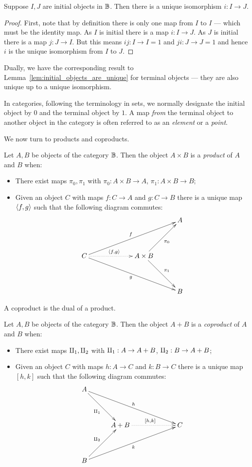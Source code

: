 \begin{lemma}\label{lem:initial_objects_are_unique}
  Suppose $I,J$ are initial objects in $\mathbb{B}$. Then there is a unique isomorphism $i:I \to J$.
\end{lemma}
\begin{proof}
  First, note that by definition there is only one map from $I$ to $I$ --- which must be the
  identity map. As $I$ is initial there is a map $i: I \to J$. As $J$ is initial there is a map
  $j:J \to I$. But this means $i j : I \to I = 1$ and $j i : J \to J = 1$ and hence $i$ is the
  unique isomorphism from $I$ to $J$.
\end{proof}

Dually, we have the corresponding result to Lemma~\ref{lem:initial_objects_are_unique} for terminal
objects --- they are also unique up to a unique isomorphism.

In categories, following the terminology in sets, we normally designate the initial object by $0$
and the terminal object by $1$.
A map \emph{from} the terminal object to another object in the category is often referred to as an
\emph{element} or a \emph{point}.

We now turn to products and coproducts.

\begin{definition}\label{def:categorical_product}
  Let $A,B$ be objects of the category $\mathbb{B}$. Then the object $A \times B$ is a \emph{product} of
  $A$ and $B$ when:
  \begin{itemize}
    \item There exist maps $\pi_0, \pi_1$ with $\pi_0:A\times B \to A$, $\pi_1:A\times B \to B$;
    \item Given an object $C$ with maps $f:C\to A$ and $g:C \to B$ there is a unique map
    $\langle f,g\rangle$ such that the following diagram commutes:
    \[
      \xymatrix@C+5pt@R+15pt{
        &&&A\\
        C\ar[urrr]^{f} \ar[drrr]_{g}\ar@{.>}[rr]^{\<f,g\>} & &A\times B \ar[ur]_{\pi_0}\ar[dr]^{\pi_1}\\
        &&&B
      }
    \]
  \end{itemize}

\end{definition}

A coproduct is the dual of a product.

\begin{definition}\label{def:categorical_coproduct}
  Let $A,B$ be objects of the category $\mathbb{B}$. Then the object $A + B$ is a \emph{coproduct} of
  $A$ and $B$ when:
  \begin{itemize}
    \item There exist maps $\amalg_{1}, \amalg_{2}$ with $\amalg_{1}:A \to A + B$, $\amalg_{2}:B \to A+ B$;
    \item Given an object $C$ with maps $h:A\to C$ and $k:B \to C$ there is a unique map
    $[h,k]$ such that the following diagram commutes:
    \[
      \xymatrix@C+5pt@R+15pt{
        A \ar[drrr]^h \ar[dr]_{\cpa} \\
        &A +B \ar@{.>}[rr]^{[h,k]} && C\\
        B \ar[urrr]_k \ar[ur]^{\cpb}
      }
    \]
  \end{itemize}
\end{definition}

